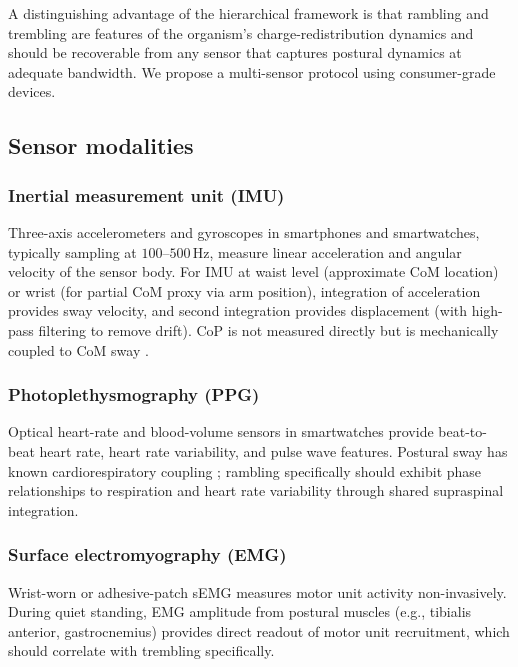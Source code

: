 \documentclass[11pt,twocolumn,a4paper]{article}
\theoremstyle{definition}
\theoremstyle{remark}
\begin{document}
A distinguishing advantage of the hierarchical framework is that
rambling and trembling are features of the organism's
charge-redistribution dynamics and should be recoverable from any
sensor that captures postural dynamics at adequate bandwidth. We
propose a multi-sensor protocol using consumer-grade devices.

\subsection{Sensor modalities}

\subsubsection{Inertial measurement unit (IMU)}

Three-axis accelerometers and gyroscopes in smartphones and
smartwatches, typically sampling at $100$--$500$\,Hz, measure
linear acceleration and angular velocity of the sensor body. For
IMU at waist level (approximate CoM location) or wrist (for
partial CoM proxy via arm position), integration of acceleration
provides sway velocity, and second integration provides
displacement (with high-pass filtering to remove drift). CoP is
not measured directly but is mechanically coupled to CoM sway
\citep{winter1998}.

\subsubsection{Photoplethysmography (PPG)}

Optical heart-rate and blood-volume sensors in smartwatches
provide beat-to-beat heart rate, heart rate variability, and
pulse wave features. Postural sway has known cardiorespiratory
coupling \citep{bonnet2014,hunter2008}; rambling specifically
should exhibit phase relationships to respiration and heart rate
variability through shared supraspinal integration.

\subsubsection{Surface electromyography (EMG)}

Wrist-worn or adhesive-patch sEMG measures motor unit activity
non-invasively. During quiet standing, EMG amplitude from
postural muscles (e.g., tibialis anterior, gastrocnemius) provides
direct readout of motor unit recruitment, which should correlate
with trembling specifically.
\end{document}
